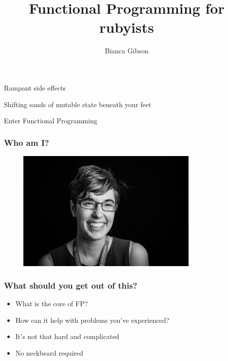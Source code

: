 \documentclass{beamer}
\title{Functional Programming for rubyists}
\author{Bianca Gibson}
\institute{Ruby Conf AU 2016}
\date{}
\begin{document}
\frame{\titlepage}

\begin{frame}
  \begin{center}
    \Huge Rampant side effects
  \end{center}
\end{frame}

\begin{frame}
  \begin{center}
    \Huge Shifting sands of mutable state beneath your feet
  \end{center}
\end{frame}

\begin{frame}
  \begin{center}
    \Huge Enter Functional Programming
  \end{center}
\end{frame}

\begin{frame}
  \frametitle{Who am I?}
  \begin{figure}[p]
    \includegraphics[width=0.8\textwidth]{./assets/portrait.jpg}
  \end{figure}
\end{frame}

\begin{frame}
  \frametitle{What should you get out of this?}
  \begin{itemize}
    \item What is the core of FP?
    \item How can it help with problems you've experienced?
    \item It's not that hard and complicated
    \item No neckbeard required
  \end{itemize}
\end{frame}
\end{document}
